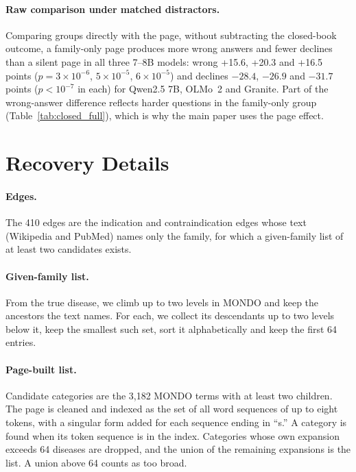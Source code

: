 \documentclass[letterpaper]{article} %
\begin{document}
\paragraph{Raw comparison under matched distractors.}
Comparing groups directly with the page, without subtracting the closed-book
outcome, a family-only page produces more wrong answers and fewer declines
than a silent page in all three 7--8B models: wrong +15.6, +20.3 and +16.5
points ($p = 3\times10^{-6}$, $5\times10^{-5}$, $6\times10^{-5}$) and declines
$-28.4$, $-26.9$ and $-31.7$ points ($p < 10^{-7}$ in each) for Qwen2.5 7B,
OLMo~2 and Granite. Part of the
wrong-answer difference reflects harder questions in the family-only group
(Table~\ref{tab:closed_full}), which is why the main paper uses the page
effect.

\section{Recovery Details}

\paragraph{Edges.}
The 410 edges are the indication and contraindication edges whose text
(Wikipedia and PubMed) names only the family, for which a given-family list
of at least two candidates exists.

\paragraph{Given-family list.}
From the true disease, we climb up to two levels in MONDO and keep the
ancestors the text names. For each, we collect its descendants up to two
levels below it, keep the smallest such set, sort it alphabetically and keep
the first 64 entries.

\paragraph{Page-built list.}
Candidate categories are the 3,182 MONDO terms with at least two children.
The page is cleaned and indexed as the set of all word sequences of up to
eight tokens, with a singular form added for each sequence ending in ``s.'' A
category is found when its token sequence is in the index. Categories whose
own expansion exceeds 64 diseases are dropped, and the union of the remaining
expansions is the list. A union above 64 counts as too broad.
\end{document}
